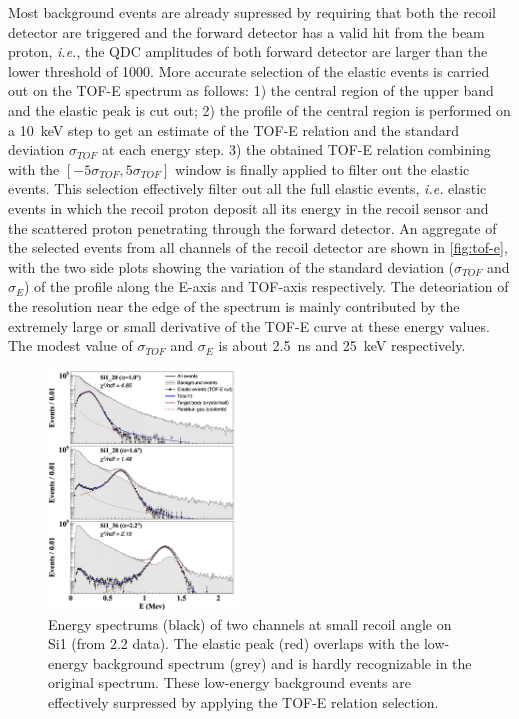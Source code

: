 \documentclass[number,5p]{elsarticle}
\begin{document}
Most background events are already supressed by requiring that both
the recoil detector are triggered and the forward detector has a valid
hit from the beam proton, \textit{i.e.}, the QDC amplitudes of both forward detector
are larger than the lower threshold of \num{1000}.
More accurate selection of the elastic events is carried out on the TOF-E spectrum as follows:
1) the central region of the upper band and the elastic peak is cut out;
2) the profile of the central region is performed on a \SI{10}{\keV} step to get an
estimate of the TOF-E relation and the standard deviation $\sigma_{TOF}$ at each energy step.
3) the obtained TOF-E relation combining with the $[-5\sigma_{TOF}, 5\sigma_{TOF}]$ window is finally applied to filter out the elastic events.
This selection effectively filter out all the full elastic events, \textit{i.e.}
elastic events in which the recoil proton deposit all its energy in the recoil
sensor and the scattered proton penetrating through the forward detector. 
An aggregate of the selected events from all channels of the recoil detector are
shown in \ref{fig:tof-e}, with the two side plots showing the variation of the
standard deviation ($\sigma_{TOF}$ and $\sigma_{E}$) of the profile along the E-axis and TOF-axis respectively.
The deteoriation of the resolution near the edge of the spectrum is mainly
contributed by the extremely large or small derivative of the TOF-E curve at
these energy values.
The modest value of $\sigma_{TOF}$ and $\sigma_{E}$ is about
\SI{2.5}{\nano\second} and \SI{25}{\keV} respectively.

\begin{figure}[h!]
  \centering
  \includegraphics[width=0.45\textwidth]{./tofe_cut_comparison.png}
  \caption{Energy spectrums (black) of two channels at small recoil angle on Si1 (from
    \SI{2.2}{\momentum} data). The elastic peak (red) overlaps with the low-energy background
    spectrum (grey) and is hardly recognizable in the original spectrum. These low-energy background events are effectively surpressed by applying the TOF-E relation selection.}
  \label{fig:cut}
\end{figure}
\end{document}
